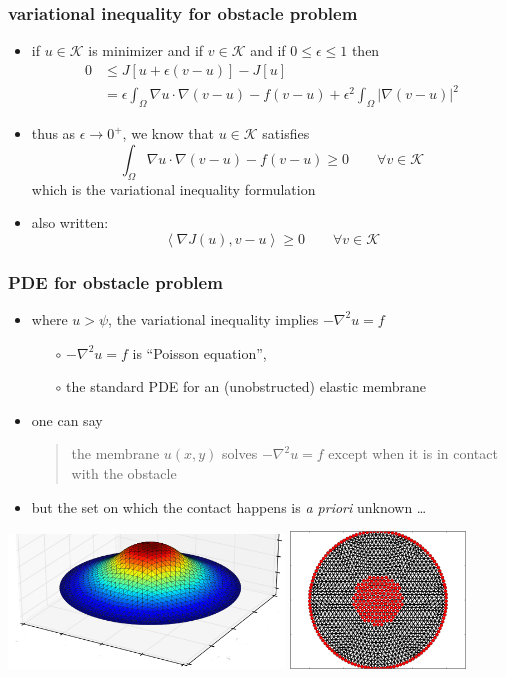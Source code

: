 \documentclass{beamer}
\newcommand{\eps}{\epsilon}
\newcommand{\grad}{\nabla}
\begin{document}
\begin{frame}
  \frametitle{variational inequality for obstacle problem}

\begin{itemize}
\item if $u\in \mathcal{K}$ is minimizer and if $v\in\mathcal{K}$ and if $0\le \eps \le 1$ then
   \begin{align*}
   0 &\le J[u + \eps(v-u)] - J[u] \\
     &= \eps \int_\Omega \grad u \cdot \grad(v-u) - f (v-u) + \eps^2 \int_\Omega |\grad(v-u)|^2
   \end{align*}
\item thus as $\eps \to 0^+$, we know that $u\in\mathcal{K}$ satisfies
  $$\int_\Omega \grad u \cdot \grad(v-u) - f (v-u) \ge 0 \qquad \forall v\in\mathcal{K}$$
which is the variational inequality formulation
\item also written:
  $$\left<\grad J(u), v-u\right> \ge 0 \qquad \forall v\in\mathcal{K}$$
\end{itemize}
\end{frame}


\begin{frame}
  \frametitle{PDE for obstacle problem}

\small
\begin{itemize}
\item where $u>\psi$, the variational inequality implies $-\grad^2 u = f$
   \begin{itemize}
   \item[$\circ$] $-\grad^2 u = f$ is ``Poisson equation'',
   \item[$\circ$] the standard PDE for an (unobstructed) elastic membrane
   \end{itemize}
\item one can say
\begin{quote}
the membrane $u(x,y)$ solves $-\grad^2 u = f$ except when it is in contact with the obstacle
\end{quote}
\item but the set on which the contact happens is \emph{a priori} unknown \dots
\end{itemize}
\normalsize

\begin{center}
\includegraphics[width=0.55\textwidth]{figs/obs-soln} \quad \includegraphics[width=0.35\textwidth]{figs/obs-coincidence} 
\end{center}
\end{frame}
\end{document}

